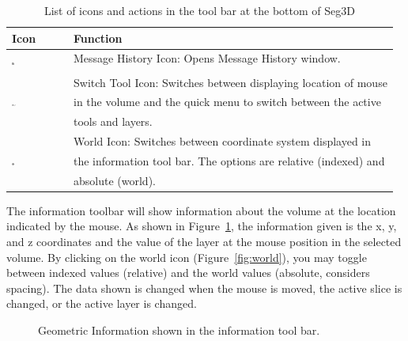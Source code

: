 \documentclass[fleqn,11pt,openany]{book}
\begin{document}
\begin{table}[h!]
\label{tab:toolbaricons}
\caption{List of icons and actions in the tool bar at the bottom of Seg3D}
\begin{tabular}{|l|l|}
\hline
{\bf Icon} & {\bf Function}\\
\hline
\multirow{2}{*}{ \includegraphics[width=0.05\textwidth]{Seg3DBasicFunctionality_figures/TextOff.png} }
& Message History Icon: Opens Message History window.\\
& \\
\hline
\multirow{3}{*}{ \includegraphics[width=0.08\textwidth]{Seg3DBasicFunctionality_figures/SwitchTool.png} }
& Switch Tool Icon:  Switches between displaying location of mouse\\
& in the volume and the quick menu to switch between the active \\
& tools and layers.\\
\hline
\multirow{3}{*}{ \includegraphics[width=0.05\textwidth]{Seg3DBasicFunctionality_figures/WorldOff.png} }
& World Icon:  Switches between coordinate system displayed in \\
& the information tool bar.  The options are relative (indexed) and \\
& absolute (world).\\
\hline
\end{tabular}
\end{table}

The information toolbar will show information about the volume at the location indicated by the mouse.  As shown in Figure~\ref{fig:geometricinfo}, the information given is the x, y, and z coordinates and the value of the layer at the mouse position in the selected volume.  By clicking on the world icon (Figure~\ref{fig:world}), you may toggle between indexed values (relative) and the world values (absolute, considers spacing).  The data shown is changed when the mouse is moved, the active slice is changed, or the active layer is changed.

\begin{figure}[h!]
\caption{Geometric Information shown in the information tool bar.}\label{fig:geometricinfo}
\end{figure}
\end{document}
